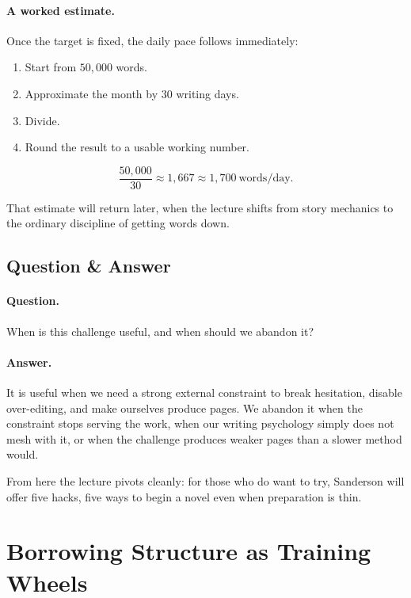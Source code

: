 \paragraph{A worked estimate.} Once the target is fixed, the daily pace follows immediately:
\begin{enumerate}
\item Start from \(50{,}000\) words.
\item Approximate the month by \(30\) writing days.
\item Divide.
\item Round the result to a usable working number.
\end{enumerate}

\begin{equation}
\frac{50{,}000}{30}\approx 1{,}667 \approx 1{,}700\ \text{words/day}.
\end{equation}

That estimate will return later, when the lecture shifts from story mechanics to the ordinary discipline of getting words down.

\subsection{Question \& Answer}

\paragraph{Question.} When is this challenge useful, and when should we abandon it?

\paragraph{Answer.} It is useful when we need a strong external constraint to break hesitation, disable over-editing, and make ourselves produce pages. We abandon it when the constraint stops serving the work, when our writing psychology simply does not mesh with it, or when the challenge produces weaker pages than a slower method would.

From here the lecture pivots cleanly: for those who do want to try, Sanderson will offer five hacks, five ways to begin a novel even when preparation is thin.

\section{Borrowing Structure as Training Wheels}

